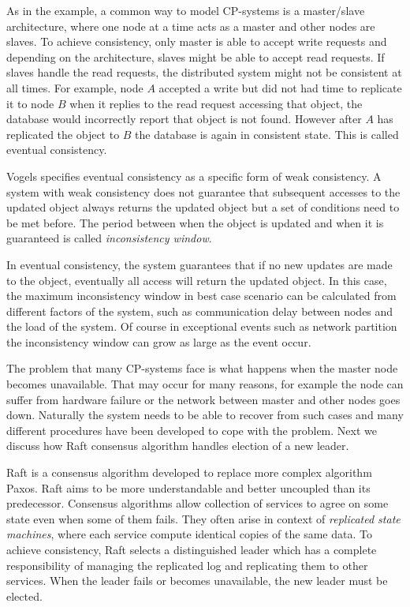As in the example, a common way to model CP-systems is a master/slave
architecture, where one node at a time acts as a master and other nodes are
slaves. To achieve consistency, only master is able to accept write requests and
depending on the architecture, slaves might be able to accept read requests. If
slaves handle the read requests, the distributed system might not be consistent
at all times. For example, node \(A\) accepted a write but did not had time to
replicate it to node \(B\) when it replies to the read request accessing that
object, the database would incorrectly report that object is not found. However
after \(A\) has replicated the object to \(B\) the database is again in
consistent state. This is called eventual consistency.

Vogels specifies eventual consistency as a specific form of weak
consistency\cite{vogels2009eventually}. A system with weak consistency does not
guarantee that subsequent accesses to the updated object always returns the
updated object but a set of conditions need to be met before. The period between
when the object is updated and when it is guaranteed is called
\emph{inconsistency window}.

In eventual consistency, the system guarantees that if no new updates are made
to the object, eventually all access will return the updated object. In this
case, the maximum inconsistency window in best case scenario can be calculated
from different factors of the system, such as communication delay between nodes
and the load of the system. Of course in exceptional events such as network
partition the inconsistency window can grow as large as the event occur.

The problem that many CP-systems face is what happens when the master node
becomes unavailable. That may occur for many reasons, for example the node can
suffer from hardware failure or the network between master and other nodes goes
down. Naturally the system needs to be able to recover from such cases and many
different procedures have been developed to cope with the problem. Next we
discuss how Raft consensus algorithm handles election of a new leader.

Raft is a consensus algorithm developed to replace more complex algorithm Paxos.
Raft aims to be more understandable and better uncoupled than its
predecessor\cite{chiefari1998living}. Consensus algorithms allow collection of
services to agree on some state even when some of them fails. They often arise
in context of \emph{replicated state machines}, where each service compute
identical copies of the same data. To achieve consistency, Raft selects a
distinguished leader which has a complete responsibility of managing the
replicated log and replicating them to other services. When the leader fails or
becomes unavailable, the new leader must be elected.

